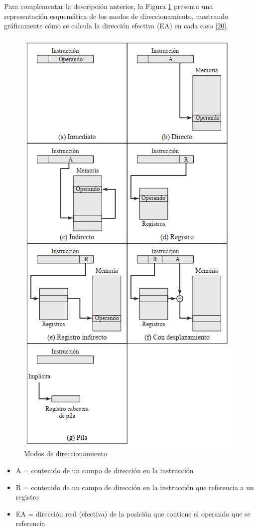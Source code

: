 \documentclass[12pt,oneside]{templates/unerthesis}
\providecommand{\tightlist}{%
  \setlength{\itemsep}{0pt}\setlength{\parskip}{0pt}}
\begin{document}
Para complementar la descripción anterior, la Figura \ref{fig:ModDir} presenta una representación esquemática de los modos de direccionamiento, mostrando gráficamente cómo se calcula la dirección efectiva (EA) en cada caso \protect\hyperlink{ref-stallings_computer_2021}{{[}20{]}}.

\begin{figure}

{\centering \includegraphics[width=0.6\linewidth]{images/modosdireccionamiento} 

}

\caption{Modos de direccionamiento }\label{fig:ModDir}
\end{figure}

\begin{itemize}
\tightlist
\item
  A = contenido de un campo de dirección en la instrucción
\item
  R = contenido de un campo de dirección en la instrucción que referencia a un registro
\item
  EA = dirección real (efectiva) de la posición que contiene el operando que se referencia
\end{itemize}
\end{document}
